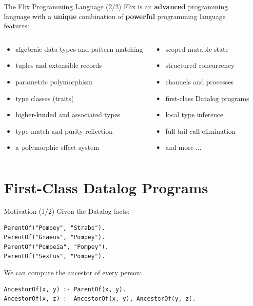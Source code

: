 \begin{frame}{The Flix Programming Language (2/2)}
Flix is an \textbf{advanced} programming language with a \textbf{unique}
combination of \textbf{powerful} programming language features: 

\small
\begin{columns}
\begin{column}{.55\textwidth}
\begin{itemize}
    \item algebraic data types and pattern matching 
    \item tuples and extensible records 
    \item parametric polymorphism
    \item type classes (traits)
    \item higher-kinded and associated types
    \item type match and purity reflection
    \item a polymorphic effect system 
\end{itemize}
\end{column}
\begin{column}{.45\textwidth}
\begin{itemize}
    \item scoped mutable state
    \item structured concurrency
    \item channels and processes
    \item first-class Datalog programs
    \item local type inference
    \item full tail call elimination
    \item and more ...
\end{itemize}
\end{column}
\end{columns}
\end{frame}

\section{First-Class Datalog Programs}

\begin{frame}[fragile]{Motivation (1/2)}
Given the Datalog facts:

\begin{lstlisting}[language=flix, xleftmargin=0.8cm]
ParentOf("Pompey", "Strabo").
ParentOf("Gnaeus", "Pompey").
ParentOf("Pompeia", "Pompey").
ParentOf("Sextus", "Pompey").
\end{lstlisting}

We can compute the ancestor of every person:

\begin{lstlisting}[language=flix, xleftmargin=0.8cm]
AncestorOf(x, y) :- ParentOf(x, y).
AncestorOf(x, z) :- AncestorOf(x, y), AncestorOf(y, z).
\end{lstlisting}
\end{frame}

